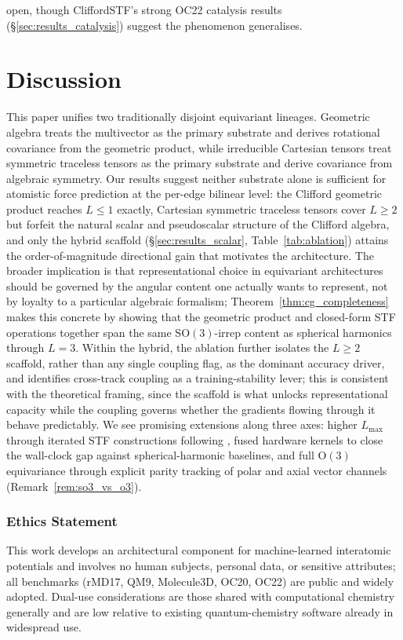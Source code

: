 open, though CliffordSTF's strong OC22 catalysis results (\S\ref{sec:results_catalysis}) suggest the phenomenon generalises.

\section{Discussion}\label{sec:discussion}

This paper unifies two traditionally disjoint equivariant lineages. Geometric algebra treats the multivector as the primary substrate and derives rotational covariance from the geometric product, while irreducible Cartesian tensors treat symmetric traceless tensors as the primary substrate and derive covariance from algebraic symmetry. Our results suggest neither substrate alone is sufficient for atomistic force prediction at the per-edge bilinear level: the Clifford geometric product reaches $L \leq 1$ exactly, Cartesian symmetric traceless tensors cover $L \geq 2$ but forfeit the natural scalar and pseudoscalar structure of the Clifford algebra, and only the hybrid scaffold (\S\ref{sec:results_scalar}, Table~\ref{tab:ablation}) attains the order-of-magnitude directional gain that motivates the architecture. The broader implication is that representational choice in equivariant architectures should be governed by the angular content one actually wants to represent, not by loyalty to a particular algebraic formalism; Theorem~\ref{thm:cg_completeness} makes this concrete by showing that the geometric product and closed-form STF operations together span the same $\mathrm{SO}(3)$-irrep content as spherical harmonics through $L{=}3$. Within the hybrid, the ablation further isolates the $L \geq 2$ scaffold, rather than any single coupling flag, as the dominant accuracy driver, and identifies cross-track coupling as a training-stability lever; this is consistent with the theoretical framing, since the scaffold is what unlocks representational capacity while the coupling governs whether the gradients flowing through it behave predictably. We see promising extensions along three axes: higher $L_{\max}$ through iterated STF constructions following \citet{shao2025orthonormal}, fused hardware kernels to close the wall-clock gap against spherical-harmonic baselines, and full $\mathrm{O}(3)$ equivariance through explicit parity tracking of polar and axial vector channels (Remark~\ref{rem:so3_vs_o3}).

\subsubsection*{Ethics Statement}
This work develops an architectural component for machine-learned interatomic potentials and involves no human subjects, personal data, or sensitive attributes; all benchmarks (rMD17, QM9, Molecule3D, OC20, OC22) are public and widely adopted. Dual-use considerations are those shared with computational chemistry generally and are low relative to existing quantum-chemistry software already in widespread use.

